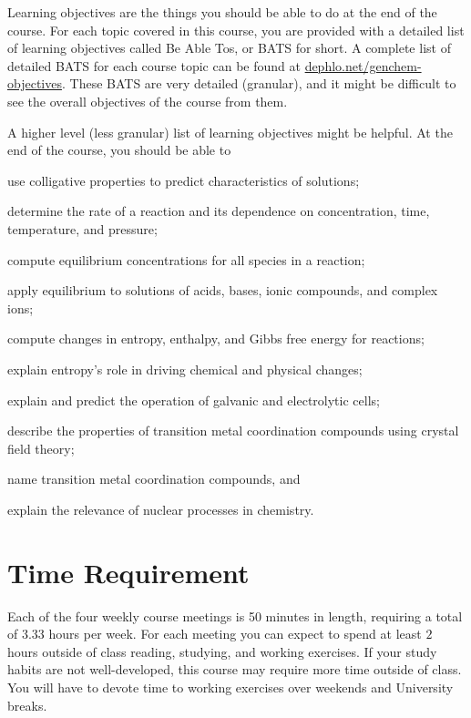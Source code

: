 \documentclass[letterpaper,oneside,onecolumn,11pt,article]{memoir}
\begin{document}
Learning objectives are the things you should be able to do at the end of the course. For each topic covered in this course, you are provided with a detailed list of learning objectives called Be Able Tos, or BATS for short. A complete list of detailed BATS for each course topic can be found at \href{http://dephlo.net/chem110/lecture/objectives}{dephlo.net/genchem-objectives}. These BATS are very detailed (granular), and it might be difficult to see the overall objectives of the course from them. 

A higher level (less granular) list of learning objectives might be helpful. At the end of the course, you should be able to 
\begin{inparaenum}
\item use colligative properties to predict characteristics of solutions;
\item determine the rate of a reaction and its dependence on concentration, time, temperature, and pressure;
\item compute equilibrium concentrations for all species in a reaction;
\item apply equilibrium to solutions of acids, bases, ionic compounds, and complex ions;
\item compute changes in entropy, enthalpy, and Gibbs free energy for reactions;
\item explain entropy's role in driving chemical and physical changes;
\item explain and predict the operation of galvanic and electrolytic cells;
\item describe the properties of transition metal coordination compounds using crystal field theory;
\item name transition metal coordination compounds, and
\item explain the relevance of nuclear processes in chemistry.
\end{inparaenum}
\section{Time Requirement}

Each of the four weekly course meetings is 50 minutes in length, requiring a total of $3.33$ hours per week. For each meeting you can expect to spend at least $2$ hours outside of class reading, studying, and working exercises. If your study habits are not well-developed, this course may require more time outside of class. You will have to devote time to working exercises over weekends and University breaks. 
\end{document}
